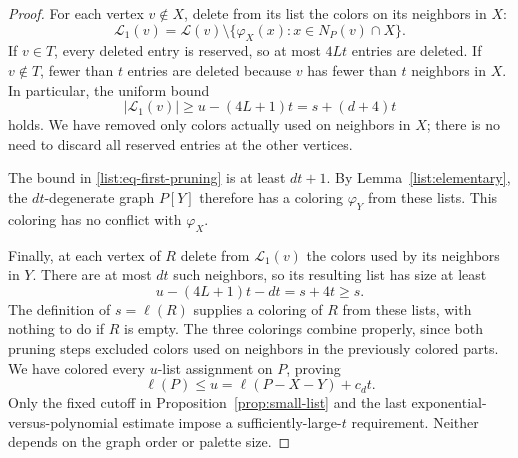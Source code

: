 \begin{proof}
For each vertex $v\notin X$, delete from its list the colors on its
neighbors in $X$:
\[
\mathcal L_1(v)=\mathcal L(v)\setminus
\{\varphi_X(x):x\in N_P(v)\cap X\}.
\]
If $v\in T$, every deleted entry is reserved, so at most $4Lt$ entries
are deleted. If $v\notin T$, fewer than $t$ entries are deleted because
$v$ has fewer than $t$ neighbors in $X$. In particular, the uniform bound
\begin{equation}\label{list:eq-first-pruning}
|\mathcal L_1(v)|\ge u-(4L+1)t=s+(d+4)t
\end{equation}
holds. We have removed only colors actually used on neighbors in $X$;
there is no need to discard all reserved entries at the other vertices.

The bound in \eqref{list:eq-first-pruning} is at least $dt+1$. By
Lemma~\ref{list:elementary}, the $dt$-degenerate graph $P[Y]$ therefore
has a coloring $\varphi_Y$ from these lists. This coloring has no conflict
with $\varphi_X$.

Finally, at each vertex of $R$ delete from $\mathcal L_1(v)$ the colors
used by its neighbors in $Y$. There are at most $dt$ such neighbors, so
its resulting list has size at least
\[
u-(4L+1)t-dt=s+4t\ge s.
\]
The definition of $s=\ell(R)$ supplies a coloring of $R$ from these
lists, with nothing to do if $R$ is empty. The three colorings combine
properly, since both pruning steps excluded colors used on neighbors in
the previously colored parts. We have colored every $u$-list assignment
on $P$, proving
\[
\ell(P)\le u=\ell(P-X-Y)+c_dt.
\]
Only the fixed cutoff in Proposition~\ref{prop:small-list} and the last
exponential-versus-polynomial estimate impose a sufficiently-large-$t$
requirement. Neither depends on the graph order or palette size.
\end{proof}
